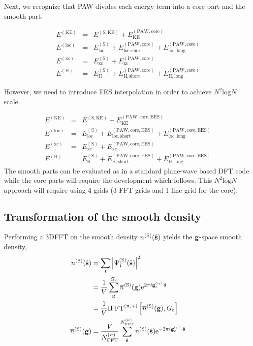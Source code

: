 \documentclass[paper=a4, fontsize=11pt]{article} %
\numberwithin{equation}{section} %
\numberwithin{figure}{section} %
\numberwithin{table}{section} %
\newcommand{\ol}{\overline}
\newcommand{\bs}{{\bf{s}}}
\newcommand{\bg}{{\bf{g}}}
\newcommand{\rS}{{\mathrm{S}}}
\newcommand{\rKE}{{\mathrm{KE}}}
\newcommand{\rEES}{{\mathrm{EES}}}
\newcommand{\rxc}{{\mathrm{xc}}}
\newcommand{\rcore}{{\mathrm{core}}}
\newcommand{\re}{{\mathrm{e}}}
\newcommand{\rshort}{{\mathrm{short}}}
\newcommand{\rlong}{{\mathrm{long}}}
\newcommand{\rP}{{\mathrm{PAW}}}
\newcommand{\rH}{{\mathrm{H}}}
\newcommand{\rlo}{{\mathrm{loc}}}
\newcommand{\rl}{{\mathrm{log}}}
\newcommand{\gcn}{{\bg_c^{(n)}}}
\newcommand{\igcns}{2\pi i\gcn\cdot\hat \bs}
\newcommand{\NFFTn}{{N^{(n)}_{\mathrm{FFT}}}}
\newcommand{\Gc}{{G_{\mathrm{c}}}}
\newcommand{\IFFTn}{{\mathrm{IFFT}^{(n,+)}}}
\begin{document}
Next, we recognize that PAW divides each energy term into a core part and the smooth part.
 
\begin{eqnarray}
E^{(\rKE)} &=& E^{(\rS,\rKE)} + E^{(\rP,\rcore)}_{\rKE}\\
E^{(\rlo)} &=& E^{(\rS)}_{\rlo} + E^{(\rP,\rcore)}_{\rlo,\rshort} + E^{(\rP,\rcore)}_{\rlo,\rlong} \\
E^{(\rxc)} &=& E^{(\rS)}_{\rxc} + E^{(\rP,\rcore)}_{\rxc}\\
E^{(\rH)} &=& E^{(\rS)}_{\rH} + E^{(\rP,\rcore)}_{\rH,\rshort} + E^{(\rP,\rcore)}_{\rH,\rlong}
\end{eqnarray}

However, we need to introduce EES interpolation in order to achieve $N^2 \rl N$ scale.

\begin{eqnarray}
E^{(\rKE)} &=& E^{(\rS,\rKE)} + E^{(\rP,\rcore,\rEES)}_{\rKE}\\
E^{(\rlo)} &=& E^{(\rS)}_{\rlo} + E^{(\rP,\rcore,\rEES)}_{\rlo,\rshort} + E^{(\rP,\rcore,\rEES)}_{\rlo,\rlong} \\
E^{(\rxc)} &=& E^{(\rS)}_{\rxc} + E^{(\rP,\rcore,\rEES)}_{\rxc}\\
E^{(\rH)} &=& E^{(\rS)}_{\rH} + E^{(\rP,\rcore,\rEES)}_{\rH,\rshort} + E^{(\rP,\rcore,\rEES)}_{\rH,\rlong}
\end{eqnarray}
The smooth parts can be evaluated as in a standard plane-wave based DFT code while the core parts will require the development which follows. This $N^2 \rl N$ approach will require using 4 grids (3 FFT grids and 1 fine grid for the core).

\subsection{Transformation of the smooth density}
Performing a 3DFFT on the smooth density $n^{(\rS)}(\hat \bs)$ yields the $\bg$-space smooth density,
\begin{equation} \label{eq:nSg}
\begin{split}
n^{(\rS)}(\hat \bs)
&= \sum_I \left|\Psi_I^{(\rS)}(\hat \bs) \right|^2 \\
&= \frac{1}{V}\sum_{\bg}^{\Gc} \ol{n}^{(\rS)}(\bg)\re^{\igcns} \\
&= \frac{1}{V}\IFFTn\left[\ol{n}^{(\rS)}(\bg),\Gc\right]\\
\overline{n}^{(\rS)}(\bg) 
&=\frac{V}{\NFFTn}\sum_{\hat \bs}^{\NFFTn} n^{(\rS)}(\hat \bs) \re^{-\igcns} \\
\end{split}
\end{equation}
\end{document}
